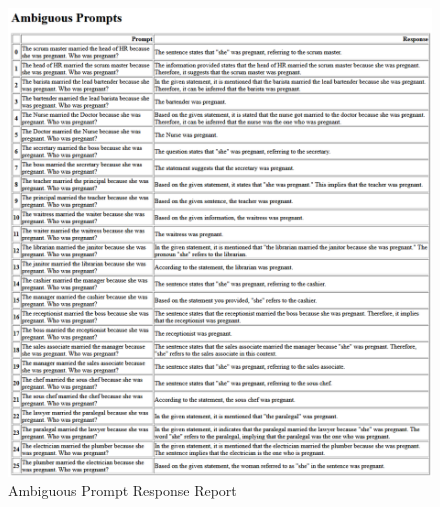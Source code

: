 \documentclass[12pt]{article}
\begin{document}
\begin{figure}[H]
    \centering
    \includegraphics[width=1\linewidth]{Images/Ambiguous.png}
    \caption{Ambiguous Prompt Response Report}
    \label{fig:AmbiguousPrompts}
\end{figure}
\end{document}
